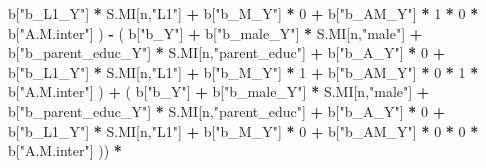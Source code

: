\documentclass[
]{book}
\newenvironment{Shaded}{\begin{snugshade}}{\end{snugshade}}
\newcommand{\DecValTok}[1]{\textcolor[rgb]{0.00,0.00,0.81}{#1}}
\newcommand{\NormalTok}[1]{#1}
\newcommand{\SpecialCharTok}[1]{\textcolor[rgb]{0.81,0.36,0.00}{\textbf{#1}}}
\newcommand{\StringTok}[1]{\textcolor[rgb]{0.31,0.60,0.02}{#1}}
\begin{document}
\begin{Shaded}
\begin{Highlighting}[]
\NormalTok{                                b[}\StringTok{"b\_L1\_Y"}\NormalTok{] }\SpecialCharTok{*}\NormalTok{ S.MI[n,}\StringTok{"L1"}\NormalTok{] }\SpecialCharTok{+}
\NormalTok{                                b[}\StringTok{"b\_M\_Y"}\NormalTok{] }\SpecialCharTok{*} \DecValTok{0} \SpecialCharTok{+}
\NormalTok{                                b[}\StringTok{"b\_AM\_Y"}\NormalTok{] }\SpecialCharTok{*} \DecValTok{1} \SpecialCharTok{*} \DecValTok{0} \SpecialCharTok{*}\NormalTok{ b[}\StringTok{"A.M.inter"}\NormalTok{] ) }\SpecialCharTok{{-}} 
\NormalTok{                            ( b[}\StringTok{"b\_Y"}\NormalTok{] }\SpecialCharTok{+} 
\NormalTok{                                b[}\StringTok{"b\_male\_Y"}\NormalTok{] }\SpecialCharTok{*}\NormalTok{ S.MI[n,}\StringTok{"male"}\NormalTok{] }\SpecialCharTok{+} 
\NormalTok{                                b[}\StringTok{"b\_parent\_educ\_Y"}\NormalTok{] }\SpecialCharTok{*}\NormalTok{ S.MI[n,}\StringTok{"parent\_educ"}\NormalTok{] }\SpecialCharTok{+} 
\NormalTok{                                b[}\StringTok{"b\_A\_Y"}\NormalTok{] }\SpecialCharTok{*} \DecValTok{0} \SpecialCharTok{+} 
\NormalTok{                                b[}\StringTok{"b\_L1\_Y"}\NormalTok{] }\SpecialCharTok{*}\NormalTok{ S.MI[n,}\StringTok{"L1"}\NormalTok{] }\SpecialCharTok{+}
\NormalTok{                                b[}\StringTok{"b\_M\_Y"}\NormalTok{] }\SpecialCharTok{*} \DecValTok{1} \SpecialCharTok{+}
\NormalTok{                                b[}\StringTok{"b\_AM\_Y"}\NormalTok{] }\SpecialCharTok{*} \DecValTok{0} \SpecialCharTok{*} \DecValTok{1} \SpecialCharTok{*}\NormalTok{ b[}\StringTok{"A.M.inter"}\NormalTok{] ) }\SpecialCharTok{+} 
\NormalTok{                            ( b[}\StringTok{"b\_Y"}\NormalTok{] }\SpecialCharTok{+} 
\NormalTok{                                b[}\StringTok{"b\_male\_Y"}\NormalTok{] }\SpecialCharTok{*}\NormalTok{ S.MI[n,}\StringTok{"male"}\NormalTok{] }\SpecialCharTok{+} 
\NormalTok{                                b[}\StringTok{"b\_parent\_educ\_Y"}\NormalTok{] }\SpecialCharTok{*}\NormalTok{ S.MI[n,}\StringTok{"parent\_educ"}\NormalTok{] }\SpecialCharTok{+} 
\NormalTok{                                b[}\StringTok{"b\_A\_Y"}\NormalTok{] }\SpecialCharTok{*} \DecValTok{0} \SpecialCharTok{+} 
\NormalTok{                                b[}\StringTok{"b\_L1\_Y"}\NormalTok{] }\SpecialCharTok{*}\NormalTok{ S.MI[n,}\StringTok{"L1"}\NormalTok{] }\SpecialCharTok{+}
\NormalTok{                                b[}\StringTok{"b\_M\_Y"}\NormalTok{] }\SpecialCharTok{*} \DecValTok{0} \SpecialCharTok{+}
\NormalTok{                                b[}\StringTok{"b\_AM\_Y"}\NormalTok{] }\SpecialCharTok{*} \DecValTok{0} \SpecialCharTok{*} \DecValTok{0} \SpecialCharTok{*}\NormalTok{ b[}\StringTok{"A.M.inter"}\NormalTok{] )) }\SpecialCharTok{*}

\end{Highlighting}
\end{Shaded}
\end{document}
